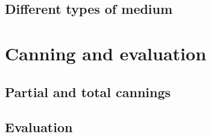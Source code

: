 \documentclass{article}
\begin{document}
\subsection{Different types of medium}

\section{Canning and evaluation}

\subsection{Partial and total cannings}

\subsection{Evaluation}

\printbibliography[heading=bibintoc]
\end{document}
